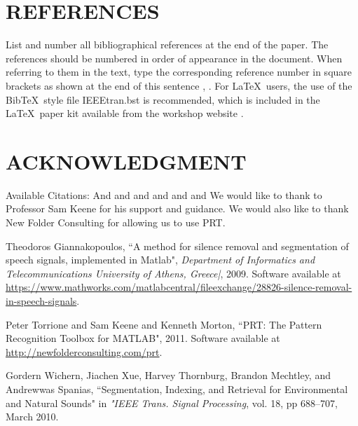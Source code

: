 \documentclass{article}
\begin{document}
\begin{sloppy}
\section{REFERENCES}
\label{sec:ref}

List and number all bibliographical references at the end 
of the paper. The references should be numbered in order 
of appearance in the document. When referring to them in 
the text, type the corresponding reference number in 
square brackets as shown at the end of this sentence 
\cite{cJones2003}, \cite{aSmith2000}. For \LaTeX\ users, 
the use of the Bib\TeX\ style file IEEEtran.bst is 
recommended, which is included in the \LaTeX\ paper 
kit available from the workshop website \cite{aaspweb}.

\section{ACKNOWLEDGMENT}
\label{sec:ack}

Available Citations:
\cite{segmentFeature}  And 
\cite{silenceRemove} and
 \cite{prt2011} and 
\cite{discrimPRT} and
 \cite{dnn} and
 \cite{audioFeatures} and 
\cite{compModel}
\cite{rwEventD}
We would like to thank to Professor Sam Keene for his support and guidance. 
We would also like to thank New Folder Consulting for allowing us to use PRT.


%
%

 \begin{thebibliography}{8}
	Theodoros Giannakopoulos, ``A method for silence removal and segmentation of speech signals, implemented in Matlab",\emph{ Department of Informatics and Telecommunications University of Athens, Greece|}, 2009. Software available at \url{https://www.mathworks.com/matlabcentral/fileexchange/28826-silence-removal-in-speech-signals}.

 Peter Torrione and Sam Keene and Kenneth Morton, ``{PRT}: The Pattern Recognition Toolbox for {MATLAB}", 2011. Software available at \url{http://newfolderconsulting.com/prt}.

 	Gordern Wichern, Jiachen Xue, Harvey Thornburg, Brandon Mechtley, and Andrewwas Spanias, ``Segmentation, Indexing, and Retrieval for Environmental and Natural Sounds" in \emph{"IEEE Trans. Signal Processing}, vol. 18, pp 688--707, March 2010.


\end{thebibliography}
\end{sloppy}
\end{document}
